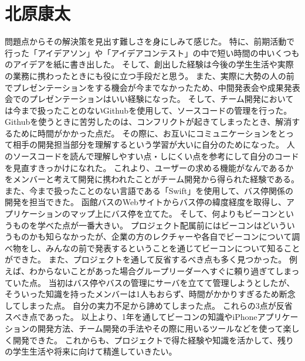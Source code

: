 \documentclass[openany,11pt,papersize]{jsbook}
\begin{document}

\section{北原康太}
問題点からその解決策を見出す難しさを身にしみて感じた。
特に、前期活動で行った「アイデアソン」や「アイデアコンテスト」の中で短い時間の中いくつものアイデアを紙に書き出した。
そして、創出した経験は今後の学生生活や実際の業務に携わったときにも役に立つ手段だと思う。
また、実際に大勢の人の前でプレゼンテーションをする機会が今までなかったため、中間発表会や成果発表会でのプレゼンテーションはいい経験になった。 
そして、チーム開発においては今まで扱ったことのないGithubを使用して、ソースコードの管理を行った。
Githubを使うときに苦労したのは、コンフリクトが起きてしまったとき、解消するために時間がかかった点だ。
その際に、お互いにコミュニケーションをとって相手の開発担当部分を理解するという学習が大いに自分のためになった。
人のソースコードを読んで理解しやすい点・しにくい点を参考にして自分のコードを見直すきっかけになれた。
これより、ユーザーの求める機能がなんであるかをメンバーと考えて開発に携われたことがチーム開発から得られた経験である。
また、今まで扱ったことのない言語である「Swift」を使用して、バス停関係の開発を担当できた。
函館バスのWebサイトからバス停の緯度経度を取得し、アプリケーションのマップ上にバス停を立てた。
そして、何よりもビーコンというものを学べた点が一番大きい。
プロジェクト配属前にはビーコンはどいういうものかも知らなかったが、企業の方のレクチャーや各自でビーコンについて調べ物をし、みんなの前で発表するということを通じてビーコンについて知ることができた。
また、プロジェクトを通して反省するべき点も多く見つかった。
例えば、わからないことがあった場合グループリーダーへすぐに頼り過ぎてしまっていた点。
当初はバス停やバスの管理にサーバを立てて管理しようとしたが、そういった知識を持ったメンバーは1人もおらず、時間がかかりすぎるため断念してしまった点。
自分の実力不足から諦めてしまった点。
これらの3点が反省スべき点であった。
以上より、1年を通してビーコンの知識やiPhoneアプリケーションの開発方法、チーム開発の手法やその際に用いるツールなどを使って楽しく開発できた。
これからも、プロジェクトで得た経験や知識を活かして、残りの学生生活や将来に向けて精進していきたい。

\end{document}
